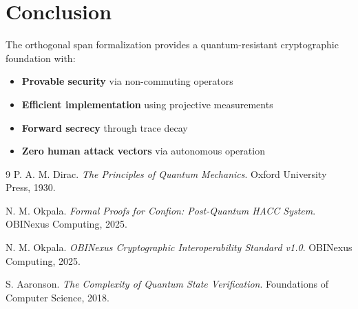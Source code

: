 \documentclass[12pt]{article}
\begin{document}
\section{Conclusion}
The orthogonal span formalization provides a quantum-resistant cryptographic foundation with:
\begin{itemize}
\item \textbf{Provable security} via non-commuting operators
\item \textbf{Efficient implementation} using projective measurements
\item \textbf{Forward secrecy} through trace decay
\item \textbf{Zero human attack vectors} via autonomous operation
\end{itemize}

\begin{thebibliography}{9}
P. A. M. Dirac. 
\textit{The Principles of Quantum Mechanics}. 
Oxford University Press, 1930.

N. M. Okpala.
\textit{Formal Proofs for Confion: Post-Quantum HACC System}.
OBINexus Computing, 2025.

N. M. Okpala.
\textit{OBINexus Cryptographic Interoperability Standard v1.0}.
OBINexus Computing, 2025.

S. Aaronson.
\textit{The Complexity of Quantum State Verification}.
Foundations of Computer Science, 2018.
\end{thebibliography}
\end{document}
